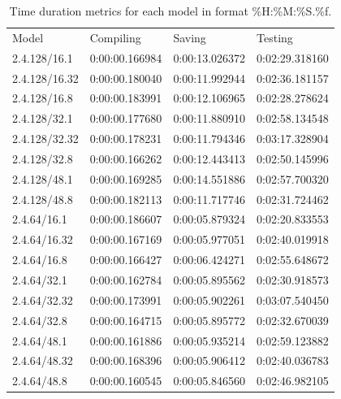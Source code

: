 \documentclass[12pt]{article}
\begin{document}
\begin{table}[H]
\centering
\begin{tabular}{llll}
Model & Compiling & Saving & Testing \\
  2.4.128/16.1    &      0:00:00.166984       &     0:00:13.026372       &     0:02:29.318160        \\
  2.4.128/16.32    &      0:00:00.180040       &     0:00:11.992944       &     0:02:36.181157        \\
  2.4.128/16.8    &      0:00:00.183991       &     0:00:12.106965       &     0:02:28.278624        \\
  2.4.128/32.1    &      0:00:00.177680       &     0:00:11.880910       &     0:02:58.134548        \\
  2.4.128/32.32    &      0:00:00.178231       &     0:00:11.794346       &     0:03:17.328904        \\
  2.4.128/32.8    &      0:00:00.166262       &     0:00:12.443413       &     0:02:50.145996        \\
  2.4.128/48.1    &      0:00:00.169285       &     0:00:14.551886       &     0:02:57.700320        \\
  2.4.128/48.8    &      0:00:00.182113       &     0:00:11.717746       &     0:02:31.724462        \\
  2.4.64/16.1    &      0:00:00.186607       &     0:00:05.879324       &     0:02:20.833553        \\
  2.4.64/16.32    &      0:00:00.167169       &     0:00:05.977051       &     0:02:40.019918        \\
  2.4.64/16.8    &      0:00:00.166427       &     0:00:06.424271       &     0:02:55.648672        \\
  2.4.64/32.1    &      0:00:00.162784       &     0:00:05.895562       &     0:02:30.918573        \\
  2.4.64/32.32    &      0:00:00.173991       &     0:00:05.902261       &     0:03:07.540450        \\
  2.4.64/32.8    &      0:00:00.164715       &     0:00:05.895772       &     0:02:32.670039        \\
  2.4.64/48.1    &      0:00:00.161886       &     0:00:05.935214       &     0:02:59.123882        \\
  2.4.64/48.32    &      0:00:00.168396       &     0:00:05.906412       &     0:02:40.036783        \\
  2.4.64/48.8    &      0:00:00.160545       &     0:00:05.846560       &     0:02:46.982105        \\
\end{tabular}
\caption{Time duration metrics for each model in format \%H:\%M:\%S.\%f.}
\label{tab:times}
\end{table}
\end{document}
